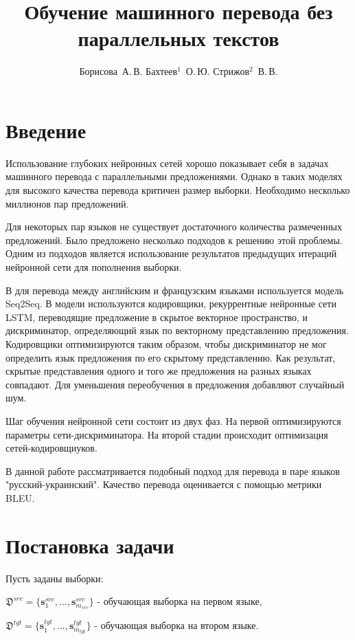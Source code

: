 \documentclass[12pt,twoside]{article}
\title
    {Обучение машинного перевода без параллельных текстов}
\author
    {Борисова~А.\,В. Бахтеев$^1$~О.\,Ю.  Стрижов$^2$~В.\,В.}
\begin{document}
\maketitle

\section{Введение}

Использование глубоких нейронных сетей хорошо показывает себя в задачах машинного перевода с параллельными предложениями\cite{Wu2016, Cho2014}. Однако в таких моделях для высокого качества перевода критичен размер выборки. Необходимо несколько миллионов пар предложений. 

Для некоторых пар языков не существует достаточного количества размеченных предложений. Было предложено несколько подходов к решению этой проблемы\cite{Zou2013,Sutskever2014}. Одним из подходов является использование результатов предыдущих итераций нейронной сети для пополнения выборки\cite{Bertoldi2009}.

В \cite{Lample2017} для перевода между английским и французским языками используется модель   Seq2Seq. В модели используются кодировщики, рекуррентные нейронные сети LSTM, переводящие предложение в скрытое векторное пространство, и дискриминатор, определяющий язык по векторному представлению предложения. Кодировщики оптимизируются таким образом, чтобы дискриминатор не мог определить язык предложения по его скрытому представлению. Как результат, скрытые представления одного и того же предложения на разных языках совпадают. Для уменьшения переобучения в предложения добавляют случайный шум.

Шаг обучения нейронной сети состоит из двух фаз. На первой оптимизируются параметры сети-дискриминатора. На второй стадии происходит оптимизация сетей-кодировщиуков.

В данной работе рассматривается подобный подход для перевода в паре языков "русский-украинский". Качество перевода оценивается с помощью метрики BLEU.

\section{Постановка задачи}
\bigskip
Пусть заданы выборки: 

$\mathfrak{D}^{src}=\{\mathbf{s}_1^{src},...,\mathbf{s}_{m_{src}}^{src}\}$ - обучающая выборка на первом языке,

$\mathfrak{D}^{tgt}=\{\mathbf{s}_1^{tgt},...,\mathbf{s}_{m_{tgt}}^{tgt}\}$ - обучающая выборка на втором языке.
\end{document}
